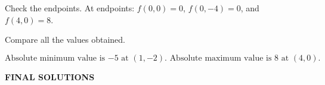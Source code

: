 \documentclass[a4paper, 12pt]{article}
\renewcommand{\headrulewidth}{0pt}
\renewcommand{\headrulewidth}{0pt}
\begin{document}
\begin{enumerate}[leftmargin=*,label=\textbf{\arabic*.}]
Check the endpoints. At endpoints: $f(0,0) = 0$, $f(0,-4) = 0$, and $f(4,0) = 8$.

Compare all the values obtained.

\[\boxed{\text{Absolute minimum value is }{-5}\text{ at }(1,-2).\text{ Absolute maximum value is }8\text{ at }(4,0).}\]

\end{enumerate}

\newpage
\renewcommand{\headrulewidth}{0pt}
\fancyhead[L]{}
\fancyhead[R]{}

\vspace*{\fill}
\begin{center}
{}
\Huge \textbf{FINAL SOLUTIONS}
\end{center}
\vspace*{\fill}

\newpage
\renewcommand{\headrulewidth}{1pt}

{}


\end{document}
